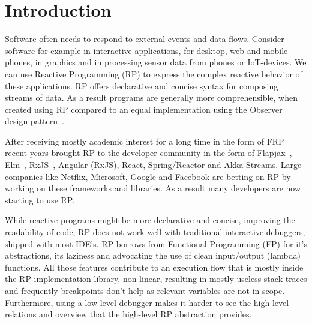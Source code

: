 \section{Introduction}

Software often needs to respond to external events and data flows. Consider software for example in interactive applications, for desktop, web and mobile phones, in graphics and in processing sensor data from phones or IoT-devices. We can use Reactive Programming (RP) to express the complex reactive behavior of these applications. RP offers declarative and concise syntax for composing streams of data. As a result programs are generally more comprehensible, when created using RP compared to an equal implementation using the Observer design pattern~\cite{johnson1995design, salvaneschi2014empirical}.

After receiving mostly academic interest for a long time in the form of FRP~\cite{elliott1997functional,elliott2009push,czaplicki2013asynchronous,maier2010deprecating} recent years brought RP to the developer community in the form of Flapjax~\cite{meyerovich2009flapjax}, Elm~\cite{czaplicki2012elm}, RxJS~\cite{meijer2010subject}, Angular (RxJS), React, Spring/Reactor and Akka Streams. Large companies like Netflix, Microsoft, Google and Facebook are betting on RP by working on these frameworks and libraries. As a result many developers are now starting to use RP.



While reactive programs might be more declarative and concise, improving the readability of code, RP does not work well with traditional interactive debuggers, shipped with most IDE's. RP borrows from Functional Programming (FP) for it's abstractions, its laziness and advocating the use of clean input/output (lambda) functions. All those features contribute to an execution flow that is mostly inside the RP implementation library, non-linear, resulting in mostly useless stack traces and frequently breakpoints don't help as relevant variables are not in scope. Furthermore, using a low level debugger makes it harder to see the high level relations and overview that the high-level RP abstraction provides.


